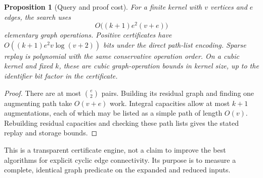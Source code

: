 \documentclass[11pt]{article}
\newtheorem{proposition}[theorem]{Proposition}
\theoremstyle{remark}\newtheorem{remark}[theorem]{Remark}
\begin{document}
\begin{proposition}[Query and proof cost]\label{prop:querycost}
For a finite kernel with $v$ vertices and $e$ edges, the search uses
\[
 O\bigl((k+1)e^2(v+e)\bigr)
\]
elementary graph operations. Positive certificates have $O((k+1)e^2v\log(v+2))$ bits under the direct path-list encoding. Sparse replay is polynomial with the same conservative operation order. On a cubic kernel and fixed $k$, these are cubic graph-operation bounds in kernel size, up to the identifier bit factor in the certificate.
\end{proposition}
\begin{proof}
There are at most $\binom e2$ pairs. Building its residual graph and finding one augmenting path take $O(v+e)$ work. Integral capacities allow at most $k+1$ augmentations, each of which may be listed as a simple path of length $O(v)$. Rebuilding residual capacities and checking these path lists gives the stated replay and storage bounds.
\end{proof}
This is a transparent certificate engine, not a claim to improve the best algorithms for explicit cyclic edge connectivity. Its purpose is to measure a complete, identical graph predicate on the expanded and reduced inputs.
\end{document}
